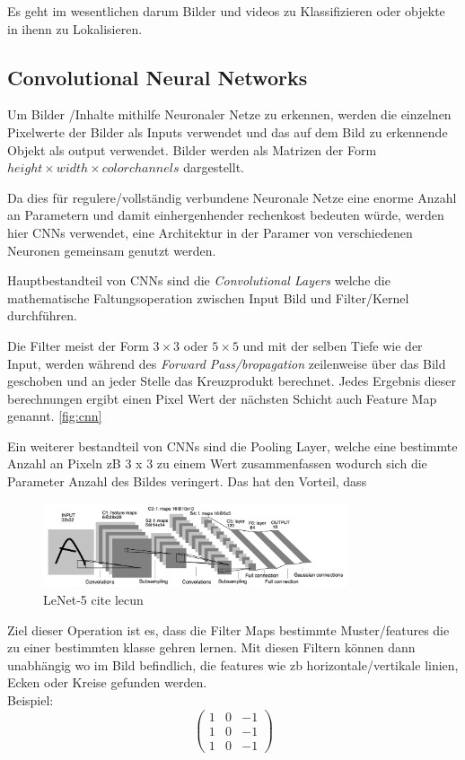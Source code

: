 Es geht im wesentlichen darum Bilder und videos zu Klassifizieren oder objekte
in ihenn zu Lokalisieren.


\subsection{Convolutional Neural Networks}

Um Bilder /Inhalte mithilfe Neuronaler Netze zu erkennen, 
werden die einzelnen Pixelwerte der Bilder als Inputs verwendet 
und das auf dem Bild zu erkennende Objekt als output verwendet. Bilder 
werden als Matrizen der Form $height\times width \times color channels$ 
dargestellt.

Da dies für regulere/vollständig verbundene Neuronale Netze eine 
enorme Anzahl an Parametern und damit einhergenhender rechenkost 
bedeuten würde, werden hier CNNs verwendet, eine Architektur in 
der Paramer von verschiedenen Neuronen gemeinsam genutzt werden.

Hauptbestandteil von CNNs sind die \textit{Convolutional Layers}
welche die mathematische Faltungsoperation zwischen Input Bild 
und Filter/Kernel durchführen.

Die Filter meist der Form $3 \times 3$ oder $5 \times 5$ und mit der 
selben Tiefe wie der Input, werden während des \textit{Forward 
Pass/bropagation} zeilenweise über das Bild geschoben und an jeder Stelle 
das Kreuzprodukt berechnet. Jedes Ergebnis dieser berechnungen ergibt einen
Pixel Wert der nächsten Schicht auch Feature Map genannt. \ref{fig:cnn}

Ein weiterer bestandteil von CNNs sind die Pooling Layer, welche eine 
bestimmte Anzahl an Pixeln zB 3 x 3 zu einem Wert zusammenfassen wodurch 
sich die Parameter Anzahl des Bildes veringert. Das hat den Vorteil, dass 


\begin{figure}[htb]
    \centering
    \label{fig:lenet}
    \includegraphics[width=0.8\textwidth]{Bilder/lenet.png}
    \caption{LeNet-5 cite lecun}
\end{figure}



Ziel dieser Operation ist es, dass die 
Filter Maps bestimmte Muster/features die zu einer bestimmten klasse 
gehren lernen. Mit diesen Filtern können dann unabhängig wo im Bild 
befindlich, die features wie zb horizontale/vertikale linien, Ecken 
oder Kreise gefunden werden. 
\\
Beispiel:
\begin{equation}
    \begin{pmatrix}
        1 & 0 & -1\\
        1 & 0 & -1\\
        1 & 0 & -1
    \end{pmatrix}
\end{equation}

